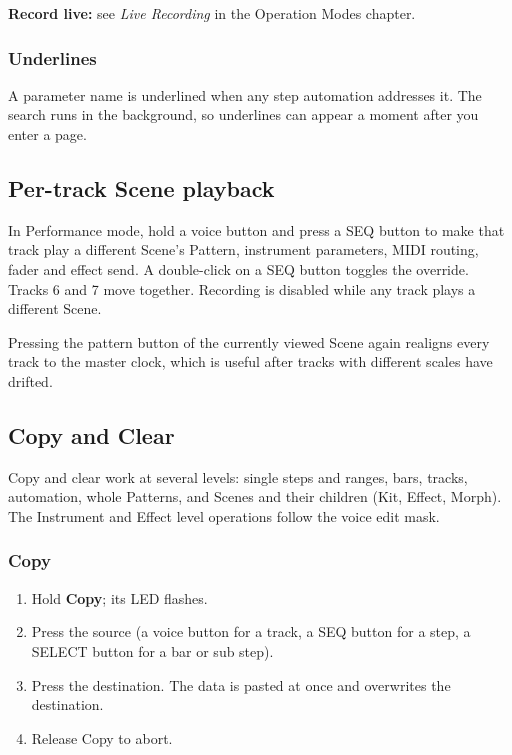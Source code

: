 \textbf{Record live:} see \emph{Live Recording} in the Operation Modes
chapter.

\subsubsection{Underlines}\label{underlines}

A parameter name is underlined when any step automation addresses it.
The search runs in the background, so underlines can appear a moment
after you enter a page.

\subsection{Per-track Scene playback}\label{per-track-scene-playback}

In Performance mode, hold a voice button and press a SEQ button to make
that track play a different Scene's Pattern, instrument parameters, MIDI
routing, fader and effect send. A double-click on a SEQ button toggles
the override. Tracks 6 and 7 move together. Recording is disabled while
any track plays a different Scene.

Pressing the pattern button of the currently viewed Scene again realigns
every track to the master clock, which is useful after tracks with
different scales have drifted.

\subsection{Copy and Clear}\label{copy-and-clear}


Copy and clear work at several levels: single steps and ranges, bars,
tracks, automation, whole Patterns, and Scenes and their children (Kit,
Effect, Morph). The Instrument and Effect level operations follow the
voice edit mask.

\subsubsection{Copy}\label{copy}

\begin{enumerate}
\def\labelenumi{\arabic{enumi}.}
\tightlist
\item
  Hold \textbf{Copy}; its LED flashes.
\item
  Press the source (a voice button for a track, a SEQ button for a step,
  a SELECT button for a bar or sub step).
\item
  Press the destination. The data is pasted at once and overwrites the
  destination.
\item
  Release Copy to abort.
\end{enumerate}

